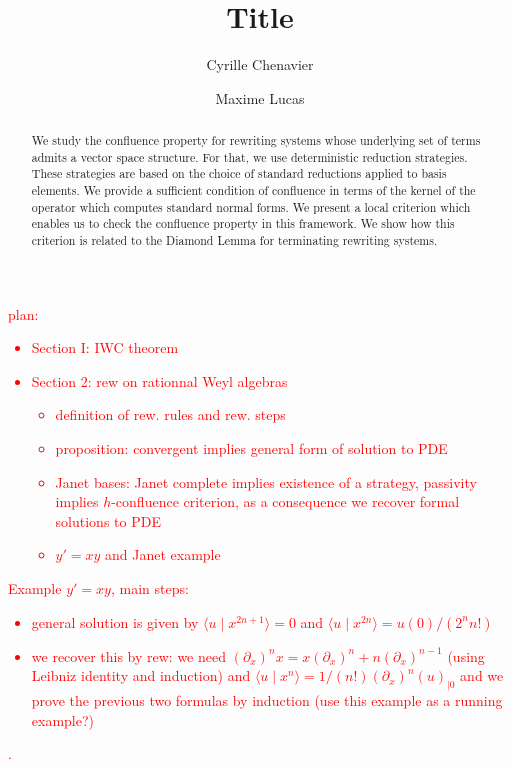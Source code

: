 \documentclass[10pt]{easychair}
\theoremstyle{definition}
\newcommand\titlePaper{{\color{red}\bf Title}}
\newcommand\todo[1]{{\bf\textcolor{red}{#1.}}}
\newcommand\Span[1]{\langle#1\rangle}
\begin{document}
\title{\titlePaper}

\author{
Cyrille Chenavier
\and
Maxime Lucas
}


\titlerunning{\titlePaper}

\maketitle

\begin{abstract}
  We study the confluence property for rewriting systems whose underlying set of terms admits a vector space structure. For that, we use deterministic reduction strategies.
  These strategies are based on the choice of standard reductions applied to basis elements.
  We provide a sufficient condition of confluence in terms of the kernel of the operator which computes standard normal forms.
  We present a local criterion which enables us to check the confluence property in this framework.
  We show how this criterion is related to the Diamond Lemma for terminating rewriting systems.
\end{abstract}

\tableofcontents

\todo{plan:
  \begin{itemize}
  \item Section I: IWC theorem
  \item Section 2: rew on rationnal Weyl algebras
    \begin{itemize}
    \item definition of rew. rules and rew. steps
    \item proposition: convergent implies general form of solution to PDE
    \item Janet bases: Janet complete implies existence of a strategy, passivity implies $h$-confluence criterion, as a consequence we recover formal solutions to PDE
    \item $y'=xy$ and Janet example
    \end{itemize}
  \end{itemize}
  Example $y'=xy$, main steps:
  \begin{itemize}
  \item general solution is given by $\Span{u\mid x^{2n+1}}=0$ and $\Span{u\mid x^{2n}}=u(0)/(2^nn!)$
  \item we recover this by rew: we need $(\partial_x)^nx=x(\partial_x)^n+n(\partial_x)^{n-1}$ (using Leibniz identity and induction) and $\Span{u\mid x^n}=1/(n!)(\partial_x)^n(u)_{\mid 0}$ and we prove the previous two formulas by induction (use this example as a running example?)
  \end{itemize}
}
\end{document}

